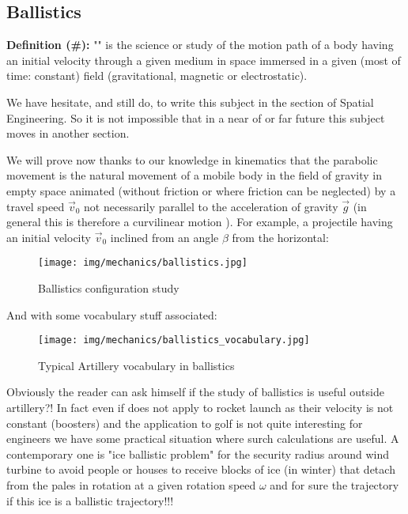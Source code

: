 	\subsection{Ballistics }
	\textbf{Definition (\#\mydef):} "" is the science or study of the motion path of a body having an initial velocity through a given medium in space immersed in a given (most of time: constant) field (gravitational, magnetic or electrostatic).
	
	\begin{tcolorbox}[title=Remarks,colframe=black,arc=10pt]
	We have hesitate, and still do, to write this subject in the section of Spatial Engineering. So it is not impossible that in a near of or far future this subject moves in another section.
	\end{tcolorbox}
		
	We will prove now thanks to our knowledge in kinematics that the parabolic movement is the natural movement of a mobile body in the field of gravity in empty space animated (without friction or where friction can be neglected) by a travel speed $\vec{v}_0$  not necessarily parallel to the acceleration of gravity $\vec{g}$ (in general this is therefore a curvilinear motion ). For example, a projectile having an initial velocity $\vec{v}_0$ inclined from an angle $\beta$ from the horizontal:

	\begin{figure}[H]
		\centering
		\texttt{[image: img/mechanics/ballistics.jpg]}
		\caption{Ballistics configuration study}
	\end{figure}
	And with some vocabulary stuff associated:
	\begin{figure}[H]
		\centering
		\texttt{[image: img/mechanics/ballistics\_vocabulary.jpg]}
		\caption[]{Typical Artillery vocabulary in ballistics}
	\end{figure}
	Obviously the reader can ask himself if the study of ballistics is useful outside artillery?! In fact even if does not apply to rocket launch as their velocity is not constant (boosters) and the application to golf is not quite interesting for engineers we have some practical situation where surch calculations are useful. A contemporary one is "ice ballistic problem" for the security radius around wind turbine to avoid people or houses to receive blocks of ice (in winter) that detach from the pales in rotation at a given rotation speed $\omega$ and for sure the trajectory if this ice is a ballistic trajectory!!! 
	
